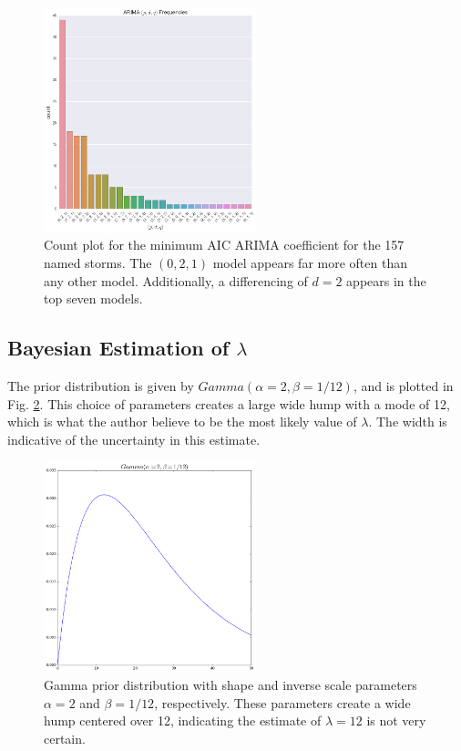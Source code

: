 \documentclass{article}
\begin{document}
	\begin{figure}[t]
			\centering
			\includegraphics[width=0.55\textwidth]{images/arima.png}
		\caption{Count plot for the minimum AIC ARIMA coefficient for the 157 named storms. The $(0,2,1)$ model appears far more often than any other model. Additionally, a differencing of $d = 2$ appears in the top seven models.}
		\label{arima}
	\end{figure}

	\subsection{Bayesian Estimation of $\lambda$}
	The prior distribution is given by $Gamma(\alpha = 2, \beta = 1/12)$, and is plotted in Fig. \ref{prior}. This choice of parameters creates a large wide hump with a mode of 12, which is what the author believe to be the most likely value of $\lambda$. The width is indicative of the uncertainty in this estimate.
		
	\begin{figure}[H]
			\centering
			\includegraphics[width = 0.55\textwidth]{images/prior.png}
		\caption{Gamma prior distribution with shape and inverse scale parameters $\alpha = 2$ and $\beta = 1/12$, respectively. These parameters create a wide hump centered over 12, indicating the estimate of $\lambda = 12$ is not very certain.}
		\label{prior}
	\end{figure}
	
\end{document}
